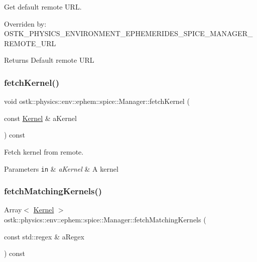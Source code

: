 Get default remote U\+RL. 

Overriden by\+: O\+S\+T\+K\+\_\+\+P\+H\+Y\+S\+I\+C\+S\+\_\+\+E\+N\+V\+I\+R\+O\+N\+M\+E\+N\+T\+\_\+\+E\+P\+H\+E\+M\+E\+R\+I\+D\+E\+S\+\_\+\+S\+P\+I\+C\+E\+\_\+\+M\+A\+N\+A\+G\+E\+R\+\_\+\+R\+E\+M\+O\+T\+E\+\_\+\+U\+RL

\begin{DoxyReturn}{Returns}
Default remote U\+RL 
\end{DoxyReturn}
\mbox{\label{classostk_1_1physics_1_1env_1_1ephem_1_1spice_1_1_manager_a7c32b7266846a0c0d0471bff27d7ce21}} 
\subsubsection{\texorpdfstring{fetch\+Kernel()}{fetchKernel()}}
{\footnotesize\ttfamily void ostk\+::physics\+::env\+::ephem\+::spice\+::\+Manager\+::fetch\+Kernel (\begin{DoxyParamCaption}\item[{const \hyperlink{classostk_1_1physics_1_1env_1_1ephem_1_1spice_1_1_kernel}{Kernel} \&}]{a\+Kernel }\end{DoxyParamCaption}) const}



Fetch kernel from remote. 


\begin{DoxyParams}[1]{Parameters}
\mbox{\tt in}  & {\em a\+Kernel} & A kernel \\
\hline
\end{DoxyParams}
\mbox{\label{classostk_1_1physics_1_1env_1_1ephem_1_1spice_1_1_manager_a5a539eb56558f1a0d6dfe1389760459f}} 
\subsubsection{\texorpdfstring{fetch\+Matching\+Kernels()}{fetchMatchingKernels()}}
{\footnotesize\ttfamily Array$<$ \hyperlink{classostk_1_1physics_1_1env_1_1ephem_1_1spice_1_1_kernel}{Kernel} $>$ ostk\+::physics\+::env\+::ephem\+::spice\+::\+Manager\+::fetch\+Matching\+Kernels (\begin{DoxyParamCaption}\item[{const std\+::regex \&}]{a\+Regex }\end{DoxyParamCaption}) const}



